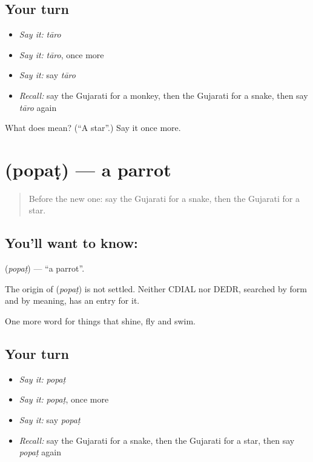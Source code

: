 \subsection*{Your turn}
\begin{itemize}
\raggedright
  \item \emph{Say it:} \emph{tāro}
  \item \emph{Say it:} \emph{tāro}, once more
  \item \emph{Say it:} say \emph{tāro}
  \item \emph{Recall:} say the Gujarati for a monkey, then the Gujarati for a snake, then say \emph{tāro} again
\end{itemize}

\begin{tcolorbox}[breakable,colback=teal!4,colframe=teal!35!black,title={Before you move on}]
What does  mean? (\textquotedblleft{}A star\textquotedblright{}.) Say it once more.
\end{tcolorbox}
\section[\texorpdfstring{\gu{પોપટ} (popaṭ)}{પોપટ (popaṭ)}]{ (popaṭ) — a parrot}

\label{lesson:GU-C69-parrot}



\begin{quote}
Before the new one: say the Gujarati for a snake, then the Gujarati for a star.
\end{quote}

\subsection*{You'll want to know: }
\textbf{} (\emph{popaṭ}) — \textquotedblleft{}a parrot\textquotedblright{}.

\begin{cousinweb}
The origin of \textbf{} (\emph{popaṭ}) is not settled. Neither CDIAL nor DEDR, searched by form and by meaning, has an entry for it.
\end{cousinweb}

\begin{grammarlens}[title={What you've built}]
One more word for things that shine, fly and swim.
\end{grammarlens}

\subsection*{Your turn}
\begin{itemize}
\raggedright
  \item \emph{Say it:} \emph{popaṭ}
  \item \emph{Say it:} \emph{popaṭ}, once more
  \item \emph{Say it:} say \emph{popaṭ}
  \item \emph{Recall:} say the Gujarati for a snake, then the Gujarati for a star, then say \emph{popaṭ} again
\end{itemize}

